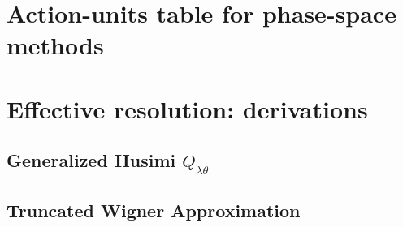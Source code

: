 \documentclass[%
  aps, amsmath, amssymb, onecolumn, 11pt
]{revtex4-2}
\begin{document}


\section{Action-units table for phase-space methods}
\label{sec:fulltable}



\section{Effective resolution: derivations}
\label{sec:derivations}

\subsection{Generalized Husimi $Q_{\lambda\theta}$}
\label{sec:genhusimi}


\subsection{Truncated Wigner Approximation}
\label{sec:twa}
\end{document}
